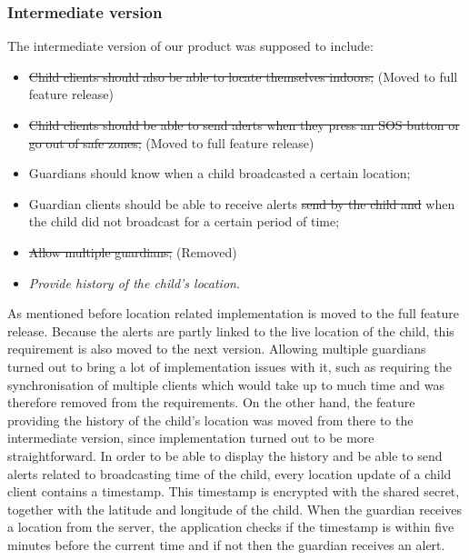 \documentclass[a4paper]{article}
\begin{document}
\subsubsection{Intermediate version}
The intermediate version of our product was supposed to include:
\begin{itemize}
    \item \sout{Child clients should also be able to locate themselves indoors;} (Moved to full feature release)
    \item \sout{Child clients should be able to send alerts when they press an SOS button or go out of safe zones;} (Moved to full feature release)
    \item Guardians should know when a child broadcasted a certain location;
    \item Guardian clients should be able to receive alerts \sout{send by the child and} when the child did not broadcast for a certain period of time;
    \item \sout{Allow multiple guardians;} (Removed)
    \item \emph{Provide history of the child's location}.
\end{itemize}
As mentioned before location related implementation is moved to the full feature release. Because the alerts are partly linked to the live location of the child, this requirement is also moved to the next version. Allowing multiple guardians turned out to bring a lot of implementation issues with it, such as requiring the synchronisation of multiple clients which would take up to much time and was therefore removed from the requirements. On the other hand, the feature providing the history of the child's location was moved from there to the intermediate version, since implementation turned out to be more straightforward. In order to be able to display the history and be able to send alerts related to broadcasting time of the child, every location update of a child client contains a timestamp. This timestamp is encrypted with the shared secret, together with the latitude and longitude of the child. When the guardian receives a location from the server, the application checks if the timestamp is within five minutes before the current time and if not then the guardian receives an alert.
\end{document}
